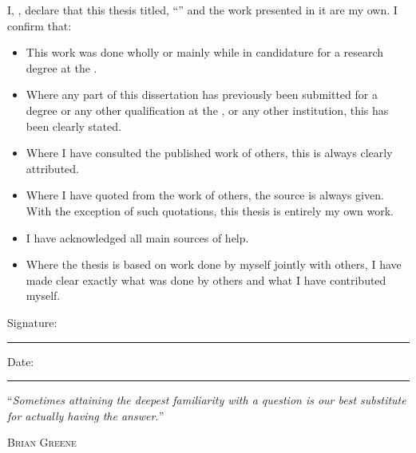 \documentclass[
11pt, %
english, %
singlespacing, %
headsepline, %
onecolumn
]{MastersDoctoralThesis} %
\begin{document}
\onecolumn %

\begin{declaration}
\addchaptertocentry{\authorshipname} %
\noindent I, \authorname, declare that this thesis titled, \enquote{\ttitle} and the work presented in it are my own. I confirm that:

\begin{itemize} 
\item This work was done wholly or mainly while in candidature for a research degree at the \univname.
\item Where any part of this dissertation has previously been submitted for a degree or any other qualification at the \univname, or any other institution, this has been clearly stated.
\item Where I have consulted the published work of others, this is always clearly attributed.
\item Where I have quoted from the work of others, the source is always given. With the exception of such quotations, this thesis is entirely my own work.
\item I have acknowledged all main sources of help.
\item Where the thesis is based on work done by myself jointly with others, I have made clear exactly what was done by others and what I have contributed myself.\\
\end{itemize}
 
\vspace*{.02\textheight}

\noindent Signature:\\
\rule[0.5em]{25em}{0.5pt} %

\vspace*{.02\textheight} 
\noindent Date:\\
\rule[0.5em]{25em}{0.5pt} %
\end{declaration}

\cleardoublepage


\vspace*{0.2\textheight}
\begin{flushright}
\noindent\enquote{\itshape Sometimes attaining the deepest familiarity with a question is our best substitute for actually having the answer.}\medskip
\end{flushright}
\hfill \textsc{Brian Greene}
\end{document}
